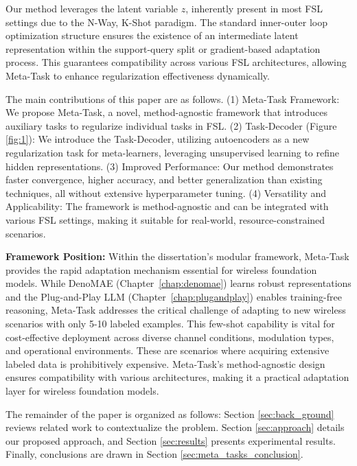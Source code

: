 Our method leverages the latent variable $z$, inherently present in most FSL settings due to the N-Way, K-Shot paradigm. The standard inner-outer loop optimization structure ensures the existence of an intermediate latent representation within the support-query split or gradient-based adaptation process. This guarantees compatibility across various FSL architectures, allowing Meta-Task to enhance regularization effectiveness dynamically.

The main contributions of this paper are as follows. (1) Meta-Task Framework: We propose Meta-Task, a novel, method-agnostic framework that introduces auxiliary tasks to regularize individual tasks in FSL. (2) Task-Decoder (Figure \ref{fig:1}): We introduce the Task-Decoder, utilizing autoencoders as a new regularization task for meta-learners, leveraging unsupervised learning to refine hidden representations. (3) Improved Performance: Our method demonstrates faster convergence, higher accuracy, and better generalization than existing techniques, all without extensive hyperparameter tuning. (4) Versatility and Applicability: The framework is method-agnostic and can be integrated with various FSL settings, making it suitable for real-world, resource-constrained scenarios.

\textbf{Framework Position:} Within the dissertation's modular framework, Meta-Task provides the rapid adaptation mechanism essential for wireless foundation models. While DenoMAE (Chapter~\ref{chap:denomae}) learns robust representations and the Plug-and-Play LLM (Chapter~\ref{chap:plugandplay}) enables training-free reasoning, Meta-Task addresses the critical challenge of adapting to new wireless scenarios with only 5-10 labeled examples. This few-shot capability is vital for cost-effective deployment across diverse channel conditions, modulation types, and operational environments. These are scenarios where acquiring extensive labeled data is prohibitively expensive. Meta-Task's method-agnostic design ensures compatibility with various architectures, making it a practical adaptation layer for wireless foundation models.

The remainder of the paper is organized as follows: Section \ref{sec:back_ground} reviews related work to contextualize the problem. Section \ref{sec:approach} details our proposed approach, and Section \ref{sec:results} presents experimental results. Finally, conclusions are drawn in Section \ref{sec:meta_tasks_conclusion}.


